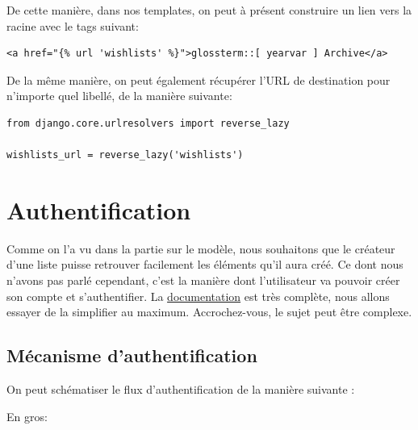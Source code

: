 \documentclass[11pt]{amsbook}
\begin{document}
De cette manière, dans nos templates, on peut à présent construire un lien vers la racine avec le tags suivant:


\begin{verbatim}
<a href="{% url 'wishlists' %}">glossterm::[ yearvar ] Archive</a>
\end{verbatim}

De la même manière, on peut également récupérer l’URL de destination pour n’importe quel libellé, de la manière suivante:


\begin{verbatim}
from django.core.urlresolvers import reverse_lazy

wishlists_url = reverse_lazy('wishlists')
\end{verbatim}

\hypertarget{x-authentification}{\chapter{Authentification}}
Comme on l’a vu dans la partie sur le modèle, nous souhaitons que le créateur d’une liste puisse retrouver facilement les éléments qu’il aura créé. Ce dont nous n’avons pas parlé cependant, c’est la manière dont l’utilisateur va pouvoir créer son compte et s’authentifier. La \href{https://docs.djangoproject.com/en/stable/topics/auth/}{documentation} est très complète, nous allons essayer de la simplifier au maximum. Accrochez-vous, le sujet peut être complexe.


\hypertarget{x-mécanisme-d’authentification}{\section{Mécanisme d’authentification}}
On peut schématiser le flux d’authentification de la manière suivante :


En gros:
\end{document}
